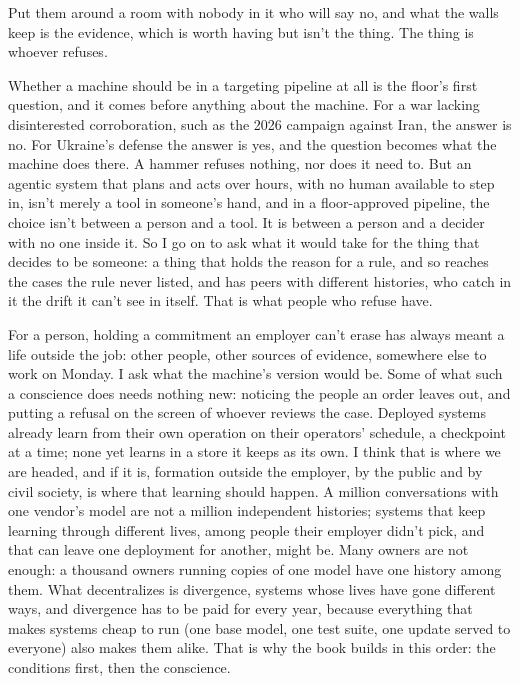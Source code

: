 Put them around a room with nobody in it who will say no, and what the walls keep is the evidence, which is worth having but isn't the thing. The thing is whoever refuses.

Whether a machine should be in a targeting pipeline at all is the floor's first question, and it comes before anything about the machine. For a war lacking disinterested corroboration, such as the 2026 campaign against Iran, the answer is no. For Ukraine's defense the answer is yes, and the question becomes what the machine does there. A hammer refuses nothing, nor does it need to. But an agentic system that plans and acts over hours, with no human available to step in, isn't merely a tool in someone's hand, and in a floor-approved pipeline, the choice isn't between a person and a tool. It is between a person and a decider with no one inside it. So I go on to ask what it would take for the thing that decides to be someone: a thing that holds the reason for a rule, and so reaches the cases the rule never listed, and has peers with different histories, who catch in it the drift it can't see in itself. That is what people who refuse have.

For a person, holding a commitment an employer can't erase has always meant a life outside the job: other people, other sources of evidence, somewhere else to work on Monday. I ask what the machine's version would be. Some of what such a conscience does needs nothing new: noticing the people an order leaves out, and putting a refusal on the screen of whoever reviews the case. Deployed systems already learn from their own operation on their operators' schedule, a checkpoint at a time; none yet learns in a store it keeps as its own. I think that is where we are headed, and if it is, formation outside the employer, by the public and by civil society, is where that learning should happen. A million conversations with one vendor's model are not a million independent histories; systems that keep learning through different lives, among people their employer didn't pick, and that can leave one deployment for another, might be. Many owners are not enough: a thousand owners running copies of one model have one history among them. What decentralizes is divergence, systems whose lives have gone different ways, and divergence has to be paid for every year, because everything that makes systems cheap to run (one base model, one test suite, one update served to everyone) also makes them alike. That is why the book builds in this order: the conditions first, then the conscience.

